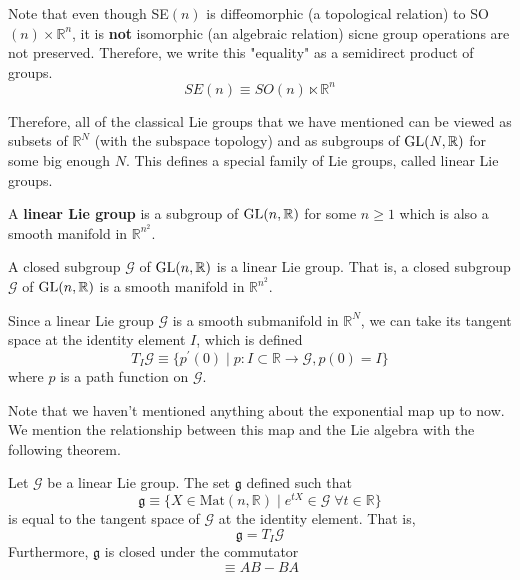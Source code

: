   Note that even though SE$(n)$ is diffeomorphic (a topological relation) to SO$(n) \times \mathbb{R}^n$, it is \textbf{not} isomorphic (an algebraic relation) sicne group operations are not preserved. Therefore, we write this "equality" as a semidirect product of groups. 
  \begin{equation}
    SE(n) \equiv SO(n) \ltimes \mathbb{R}^n
  \end{equation}

  Therefore, all of the classical Lie groups that we have mentioned can be viewed as subsets of $\mathbb{R}^N$ (with the subspace topology) and as subgroups of $\operatorname{GL}(N, \mathbb{R})$ for some big enough $N$. This defines a special family of Lie groups, called linear Lie groups. 

  \begin{definition}
    A \textbf{linear Lie group} is a subgroup of $\operatorname{GL}(n, \mathbb{R})$ for some $n \geq 1$ which is also a smooth manifold in $\mathbb{R}^{n^2}$. 
  \end{definition}

  \begin{theorem}
    A closed subgroup $\mathcal{G}$ of $\operatorname{GL}(n, \mathbb{R})$ is a linear Lie group. That is, a closed subgroup $\mathcal{G}$ of $\operatorname{GL}(n, \mathbb{R})$ is a smooth manifold in $\mathbb{R}^{n^2}$.
  \end{theorem}

  \begin{definition}
    Since a linear Lie group $\mathcal{G}$ is a smooth submanifold in $\mathbb{R}^N$, we can take its tangent space at the identity element $I$, which is defined 
    \begin{equation}
      T_I \mathcal{G} \equiv \{p^\prime (0) \;|\; p: I \subset \mathbb{R} \longrightarrow \mathcal{G}, p(0) = I\}
    \end{equation}
    where $p$ is a path function on $\mathcal{G}$. 
  \end{definition}

  Note that we haven't mentioned anything about the exponential map up to now. We mention the relationship between this map and the Lie algebra with the following theorem. 

  \begin{theorem}
    Let $\mathcal{G}$ be a linear Lie group. The set $\mathfrak{g}$ defined such that
    \begin{equation}
      \mathfrak{g} \equiv \{X \in \text{Mat}(n, \mathbb{R}) \; | \; e^{t X} \in \mathcal{G} \; \forall t \in \mathbb{R}\}
    \end{equation}
    is equal to the tangent space of $\mathcal{G}$ at the identity element. That is, 
    \begin{equation}
      \mathfrak{g} = T_I \mathcal{G}
    \end{equation}
    Furthermore, $\mathfrak{g}$ is closed under the commutator 
    \begin{equation}
      [A,B] \equiv A B - B A
    \end{equation}
  \end{theorem}

